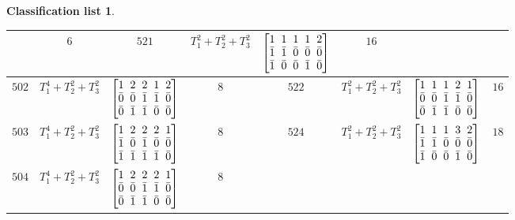 \documentclass[pdftex]{sigma}%
\theoremstyle{definition}
\newtheorem{class-list}[thm]{Classification list}
\numberwithin{equation}{section}
\begin{document}
\begin{class-list}
\begin{table}[h!]
\begin{tabu}{c|c|c|c||c|c|c|c}
&${6}$
&${521}$&${T_{1}^{2}+T_{2}^{2}+T_{3}^{2}}$
&$\arraycolsep=1mm\begin{bmatrix}{1} & {1} & {1} & {1} & {2} \\ {\bar{1}} & {\bar{1}} & {\bar{0}} & {\bar{0}} & {\bar{0}} \\ {\bar{1}} & {\bar{0}} & {\bar{0}} & {\bar{1}} & {\bar{0}}\end{bmatrix}$
&${16}$
\\
\hline
${502}$&${T_{1}^{4}+T_{2}^{2}+T_{3}^{2}}$
&$\arraycolsep=1mm\begin{bmatrix}{1} & {2} & {2} & {1} & {2} \\ {\bar{0}} & {\bar{0}} & {\bar{1}} & {\bar{1}} & {\bar{0}} \\ {\bar{0}} & {\bar{1}} & {\bar{1}} & {\bar{0}} & {\bar{0}}\end{bmatrix}$
&${8}$
&${522}$&${T_{1}^{2}+T_{2}^{2}+T_{3}^{2}}$
&$\arraycolsep=1mm\begin{bmatrix}{1} & {1} & {1} & {2} & {1} \\ {\bar{0}} & {\bar{0}} & {\bar{1}} & {\bar{1}} & {\bar{0}} \\ {\bar{0}} & {\bar{1}} & {\bar{1}} & {\bar{0}} & {\bar{0}}\end{bmatrix}$
&${16}$
\\
\hline
${503}$&
${T_{1}^{4}+T_{2}^{2}+T_{3}^{2}}$
&$\arraycolsep=1mm\begin{bmatrix}{1} & {2} & {2} & {2} & {1} \\ {\bar{1}} & {\bar{0}} & {\bar{1}} & {\bar{0}} & {\bar{0}} \\ {\bar{1}} & {\bar{1}} & {\bar{1}} & {\bar{1}} & {\bar{0}}\end{bmatrix}$
&${8}$
&${524}$&${T_{1}^{2}+T_{2}^{2}+T_{3}^{2}}$
&$\arraycolsep=1mm\begin{bmatrix}{1} & {1} & {1} & {3} & {2} \\ {\bar{1}} & {\bar{1}} & {\bar{0}} & {\bar{0}} & {\bar{0}} \\ {\bar{1}} & {\bar{0}} & {\bar{0}} & {\bar{1}} & {\bar{0}}\end{bmatrix}$
&${18}$
\\
\hline
${504}$&${T_{1}^{4}+T_{2}^{2}+T_{3}^{2}}$
&$\arraycolsep=1mm\begin{bmatrix}{1} & {2} & {2} & {2} & {1} \\ {\bar{0}} & {\bar{0}} & {\bar{1}} & {\bar{1}} & {\bar{0}} \\ {\bar{0}} & {\bar{1}} & {\bar{1}} & {\bar{0}} & {\bar{0}}\end{bmatrix}$
&${8}$
\\
\end{tabu}%
\end{table}
\end{class-list}
\end{document}
